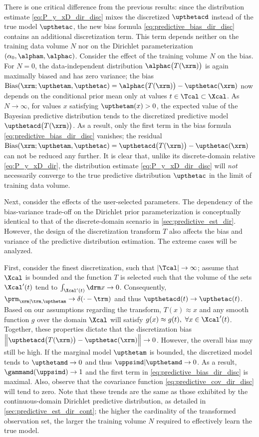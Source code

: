 \documentclass[12pt]{report}
\begin{document}
There is one critical difference from the previous results: since the distribution estimate \eqref{eq:P_y_xD_dir_disc} mixes the discretized $\upthetacd$ instead of the true model $\upthetac$, the new bias formula \eqref{eq:predictive_bias_dir_disc} contains an additional discretization term. This term depends neither on the training data volume $N$ nor on the Dirichlet parameterization $(\alpha_0, \alpham, \alphac)$. Consider the effect of the training volume $N$ on the bias. For $N=0$, the data-independent distribution $\alphac\big(T(\xrm)\big)$ is again maximally biased and has zero variance; the bias $\mathrm{Bias}(\xrm; \upthetam,\upthetac) = \alphac\big(T(\xrm)\big) - \upthetac(\xrm)$ now depends on the conditional prior mean only at values $t \in \Tcal \subset \Xcal$. As $N \to \infty$, for values $x$ satisfying $\upthetam(x) > 0$, the expected value of the Bayesian predictive distribution tends to the discretized predictive model $\upthetacd\big(T(\xrm)\big)$. As a result, only the first term in the bias formula \eqref{eq:predictive_bias_dir_disc} vanishes; the residual $\mathrm{Bias}(\xrm; \upthetam,\upthetac) = \upthetacd\big(T(\xrm)\big) - \upthetac(\xrm)$ can not be reduced any further. It is clear that, unlike its discrete-domain relative \eqref{eq:P_y_xD_dir}, the distribution estimate \eqref{eq:P_y_xD_dir_disc} will \emph{not} necessarily converge to the true predictive distribution $\upthetac$ in the limit of training data volume. 

Next, consider the effects of the user-selected parameters. The dependency of the bias-variance trade-off on the Dirichlet prior parameterization is conceptually identical to that of the discrete-domain scenario in \cref{sec:predictive_est_dir}. However, the design of the discretization transform $T$ also affects the bias and variance of the predictive distribution estimation. The extreme cases will be analyzed. 

First, consider the finest discretization, such that $|\Tcal| \to \infty$; assume that $\Xcal$ is bounded and the function $T$ is selected such that the volume of the sets $\Xcal'(t)$ tend to $\int_{\Xcal'(t)} {\drm}x \to 0$. Consequently, $\prm_{\xrm | \trm, \upthetam} \to \delta(\cdot - \trm)$ and thus $\upthetacd(t) \to \upthetac(t)$. Based on our assumptions regarding the transform, $T(x) \approx x$ and any smooth function $g$ over the domain $\Xcal$ will satisfy $g(x) \approx g(t), \ \forall x \in \Xcal'(t)$. Together, these properties dictate that the discretization bias $\Big\|\upthetacd\big(T(\xrm)\big) - \upthetac(\xrm) \Big\| \to 0$. However, the overall bias may still be high. If the marginal model $\upthetam$ is bounded, the discretized model tends to $\upthetamd \to 0$ and thus $\uppsimd | \upthetamd \to 0$. As a result, $\gammamd(\uppsimd) \to 1$ and the first term in \eqref{eq:predictive_bias_dir_disc} is maximal. Also, observe that the covariance function \eqref{eq:predictive_cov_dir_disc} will tend to zero. Note that these trends are the same as those exhibited by the continuous-domain Dirichlet predictive distribution, as detailed in \cref{sec:predictive_est_dir_cont}; the higher the cardinality of the transformed observation set, the larger the training volume $N$ required to effectively learn the true model.
\end{document}
